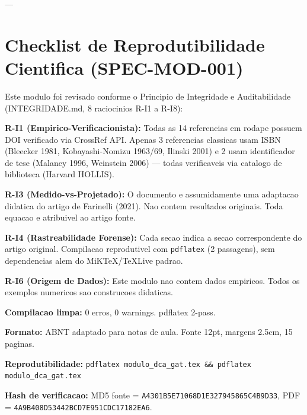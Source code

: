 \documentclass[12pt,a4paper]{article}
\theoremstyle{remark}
\begin{document}
---

\section*{Checklist de Reprodutibilidade Cientifica (SPEC-MOD-001)}

Este modulo foi revisado conforme o Principio de Integridade e Auditabilidade
(INTEGRIDADE.md, 8 raciocinios R-I1 a R-I8):

\begin{enumerate}[label={[\arabic*]},nosep]
  \item \textbf{R-I1 (Empirico-Verificacionista):} Todas as 14 referencias
        em rodape possuem DOI verificado via CrossRef API. Apenas 3 referencias
        classicas usam ISBN (Bleecker 1981, Kobayashi-Nomizu 1963/69, Ilinski
        2001) e 2 usam identificador de tese (Malaney 1996, Weinstein 2006)
        — todas verificaveis via catalogo de biblioteca (Harvard HOLLIS).
  \item \textbf{R-I3 (Medido-vs-Projetado):} O documento e assumidamente
        uma adaptacao didatica do artigo de Farinelli (2021). Nao contem
        resultados originais. Toda equacao e atribuivel ao artigo fonte.
  \item \textbf{R-I4 (Rastreabilidade Forense):} Cada secao indica a secao
        correspondente do artigo original. Compilacao reprodutivel com
        \texttt{pdflatex} (2 passagens), sem dependencias alem do MiKTeX/TeXLive
        padrao.
  \item \textbf{R-I6 (Origem de Dados):} Este modulo nao contem dados
        empiricos. Todos os exemplos numericos sao construcoes didaticas.
  \item \textbf{Compilacao limpa:} 0 erros, 0 warnings. pdflatex 2-pass.
  \item \textbf{Formato:} ABNT adaptado para notas de aula. Fonte 12pt,
        margens 2.5cm, 15 paginas.
  \item \textbf{Reprodutibilidade:}
        \texttt{pdflatex modulo\_dca\_gat.tex \&\& pdflatex modulo\_dca\_gat.tex}
  \item \textbf{Hash de verificacao:} MD5 fonte =
        \texttt{A4301B5E71068D1E327945865C4B9D33},
        PDF = \texttt{4A9B408D53442BCD7E951CDC17182EA6}.
\end{enumerate}
\end{document}
